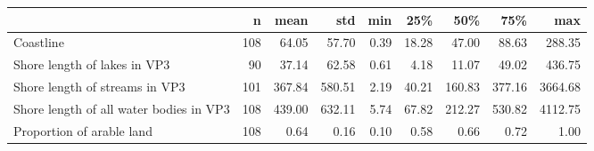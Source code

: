 \begin{tabular}{lrrrrrrrr}
\toprule
 & n & mean & std & min & 25\% & 50\% & 75\% & max \\
\midrule
Coastline & 108 & 64.05 & 57.70 & 0.39 & 18.28 & 47.00 & 88.63 & 288.35 \\
Shore length of lakes in VP3 & 90 & 37.14 & 62.58 & 0.61 & 4.18 & 11.07 & 49.02 & 436.75 \\
Shore length of streams in VP3 & 101 & 367.84 & 580.51 & 2.19 & 40.21 & 160.83 & 377.16 & 3664.68 \\
Shore length of all water bodies in VP3 & 108 & 439.00 & 632.11 & 5.74 & 67.82 & 212.27 & 530.82 & 4112.75 \\
Proportion of arable land & 108 & 0.64 & 0.16 & 0.10 & 0.58 & 0.66 & 0.72 & 1.00 \\
\bottomrule
\end{tabular}
